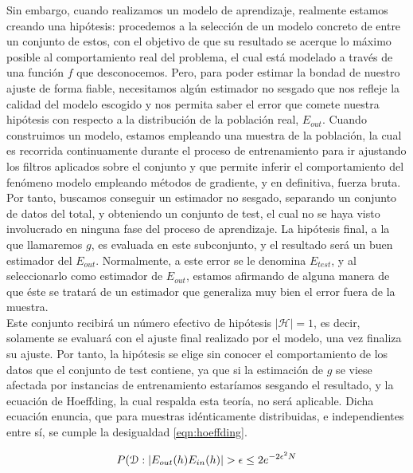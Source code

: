 Sin embargo, cuando realizamos un modelo de aprendizaje, realmente estamos creando una hipótesis: procedemos a la selección de un modelo concreto de entre un conjunto de estos, con el objetivo de que su resultado se acerque lo máximo posible al comportamiento real del problema, el cual está modelado a través de una función $f$ que desconocemos. Pero, para poder estimar la bondad de nuestro ajuste de forma fiable, necesitamos algún estimador no sesgado que nos refleje la calidad del modelo escogido y nos permita saber el error que comete nuestra hipótesis con respecto a la distribución de la población real, $E_{out}$. Cuando construimos un modelo, estamos empleando una muestra de la población, la cual es recorrida continuamente durante el proceso de entrenamiento para ir ajustando los filtros aplicados sobre el conjunto y que permite inferir el comportamiento del fenómeno modelo empleando métodos de gradiente, y en definitiva, fuerza bruta.\\

Por tanto, buscamos conseguir un estimador no sesgado, separando un conjunto de datos del total, y obteniendo un conjunto de test, el cual no se haya visto involucrado en ninguna fase del proceso de aprendizaje. La hipótesis final, a la que llamaremos $g$, es evaluada en este subconjunto, y el resultado será un buen estimador del $E_{out}$. Normalmente, a este error se le denomina $E_{test}$, y al seleccionarlo como estimador de $E_{out}$, estamos afirmando de alguna manera de que éste se tratará de un estimador que generaliza muy bien el error fuera de la muestra.\\

Este conjunto recibirá un número efectivo de hipótesis $|\mathcal H|= 1$, es decir, solamente se evaluará con el ajuste final realizado por el modelo, una vez finaliza su ajuste. Por tanto, la hipótesis se elige sin conocer el comportamiento de los datos que el conjunto de test contiene, ya que si la estimación de $g$ se viese afectada por instancias de entrenamiento estaríamos sesgando el resultado, y la ecuación de Hoeffding, la cual respalda esta teoría, no será aplicable. Dicha ecuación enuncia, que para muestras idénticamente distribuidas, e independientes entre sí, se cumple la desigualdad \ref{eqn:hoeffding}.

\begin{equation}
	\label{eqn:hoeffding}
	\centering 
	P(\mathcal{D}: | E_{out}(h) E_{in}(h) |  > \epsilon \leq 2e^{-2\epsilon^2	N}
\end{equation}


